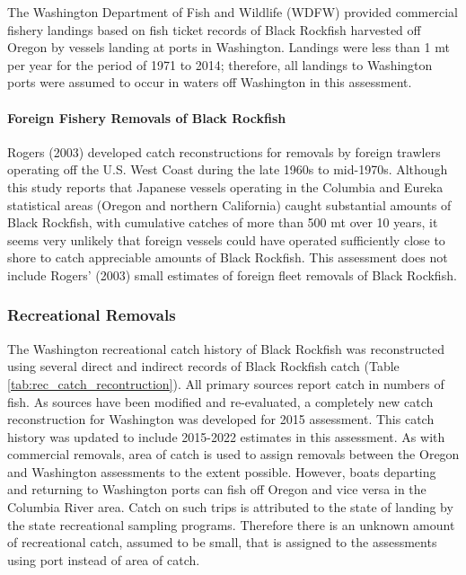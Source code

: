 \documentclass[11pt,
  letterpaper,
]{article}
\begin{document}
The Washington Department of Fish and Wildlife (WDFW) provided commercial fishery landings based on fish ticket records of Black Rockfish harvested off Oregon by vessels landing at ports in Washington. Landings were less than 1 mt per year for the period of 1971 to 2014; therefore, all landings to Washington ports were assumed to occur in waters off Washington in this assessment.

\hypertarget{foreign-fishery-removals-of-black-rockfish}{%
\paragraph{Foreign Fishery Removals of Black Rockfish}\label{foreign-fishery-removals-of-black-rockfish}}

Rogers (2003) developed catch reconstructions for removals by foreign trawlers operating off the U.S. West Coast during the late 1960s to mid-1970s. Although this study reports that Japanese vessels operating in the Columbia and Eureka statistical areas (Oregon and northern California) caught substantial amounts of Black Rockfish, with cumulative catches of more than 500 mt over 10 years, it seems very unlikely that foreign vessels could have operated sufficiently close to shore to catch appreciable amounts of Black Rockfish. This assessment does not include Rogers' (2003) small estimates of foreign fleet removals of Black Rockfish.

\hypertarget{recreational-removals}{%
\subsubsection{Recreational Removals}\label{recreational-removals}}

The Washington recreational catch history of Black Rockfish was reconstructed using several direct and indirect records of Black Rockfish catch (Table \ref{tab:rec_catch_recontruction}). All primary sources report catch in numbers of fish. As sources have been modified and re-evaluated, a completely new catch reconstruction for Washington was developed for 2015 assessment. This catch history was updated to include 2015-2022 estimates in this assessment. As with commercial removals, area of catch is used to assign removals between the Oregon and Washington assessments to the extent possible. However, boats departing and returning to Washington ports can fish off Oregon and vice versa in the Columbia River area. Catch on such trips is attributed to the state of landing by the state recreational sampling programs. Therefore there is an unknown amount of recreational catch, assumed to be small, that is assigned to the assessments using port instead of area of catch.
\end{document}
